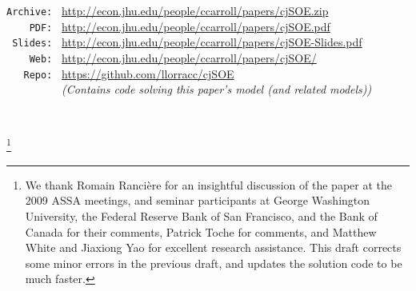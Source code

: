 \documentclass[titlepage]{\econtex}\newcommand{\texname}{cjSOE}
\begin{document}
\begin{small}
\parbox{\textwidth}{
\begin{center}
\begin{tabbing}
\texttt{Archive:~} \= \= \url{http://econ.jhu.edu/people/ccarroll/papers/cjSOE.zip} \kill \\  %
\texttt{~~~~PDF:~}\> \> \url{http://econ.jhu.edu/people/ccarroll/papers/cjSOE.pdf} \\
\texttt{~Slides:~}\> \> \url{http://econ.jhu.edu/people/ccarroll/papers/cjSOE-Slides.pdf} \\
\texttt{~~~~Web:~} \> \> \url{http://econ.jhu.edu/people/ccarroll/papers/cjSOE/}    \\
\texttt{~~~Repo:~} \> \> \url{https://github.com/llorracc/cjSOE} \\
\texttt{~~~~~~~~~} \> \> {\it (Contains code solving this paper's model (and related models))}
\end{tabbing}
\end{center}
}
\end{small}

\begin{authorsinfo}
\\
\end{authorsinfo}

\thanks{We thank Romain Ranci\`ere for an insightful discussion of the
  paper at the 2009 ASSA meetings, and seminar participants at George
  Washington University, the Federal Reserve Bank of San Francisco,
  and the Bank of Canada for their comments, Patrick Toche for
  comments, and Matthew White and Jiaxiong Yao for excellent research assistance.  This draft corrects some minor errors in the previous draft, and updates the solution code to be much faster.}

\titlepagefinish
\setcounter{page}{1}
\end{document}
